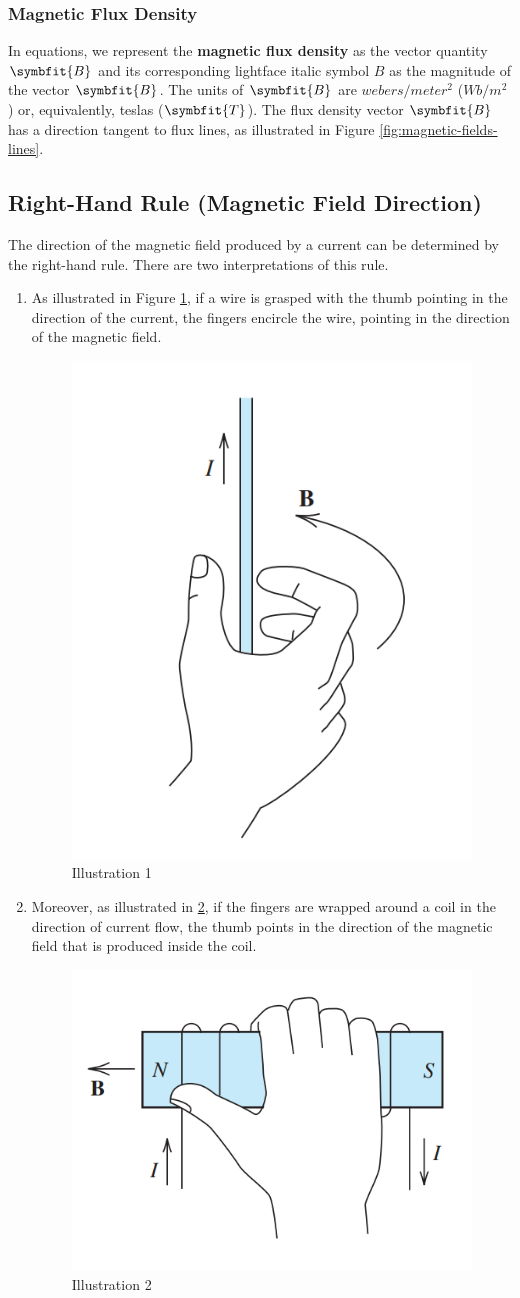 \documentclass[math,code]{amznotes}
\theoremstyle{remark}
\begin{document}
\subsubsection{Magnetic Flux Density}
In equations, we represent the \textbf{magnetic flux density} as the vector quantity $\symbfit{B}$ and its corresponding lightface italic symbol $\textit{B}$ as the magnitude of the vector $\symbfit{B}$. The units of $\symbfit{B}$ are $webers/{meter}^2$ ($Wb/m^2$) or, equivalently, teslas ($\symbfit{T}$). The flux density vector $\symbfit{B}$ has a direction tangent to flux lines, as illustrated in Figure \ref{fig:magnetic-fields-lines}.
\subsection{Right-Hand Rule (Magnetic Field Direction)}
The direction of the magnetic field produced by a current can be determined by the right-hand rule. There are two interpretations of this rule.
\begin{enumerate}
    \item As illustrated in Figure \ref{fig:right-hand-rule-1}, if a wire is grasped with the thumb pointing in the direction of the current, the fingers encircle the wire, pointing in the direction of the magnetic field.
    \begin{figure}[H]
        \centering
        \includegraphics[width=0.3\linewidth]{images/right-hand-rule-1.png}
        \caption{Illustration 1}
        \label{fig:right-hand-rule-1}
    \end{figure}
    \item Moreover, as illustrated in \ref{fig:right-hand-rule-2}, if the fingers are wrapped around a coil in the direction of current flow, the thumb points in the direction of the magnetic field that is produced inside the coil.
    \begin{figure}[H]
        \centering
        \includegraphics[width=0.3\linewidth]{images/right-hand-rule-2.png}
        \caption{Illustration 2}
        \label{fig:right-hand-rule-2}
    \end{figure}
\end{enumerate}
\end{document}
